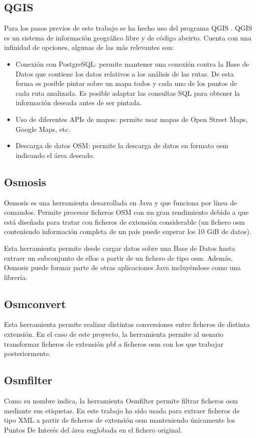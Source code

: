 \subsection{QGIS}
Para los pasos previos de este trabajo se ha hecho uso del programa QGIS \cite{qgis:info}. QGIS es un sistema de información geográfico libre y de código abeirto. Cuenta con una infinidad de opciones, algunas de las más relevantes son:

\begin{itemize}
	\item Conexión con PostgreSQL: permite mantener una conexión contra la Base de Datos que contiene los datos relativos a los análisis de las rutas. De esta forma es posible pintar sobre un mapa todos y cada uno de los puntos de cada ruta analizada. Es posible adaptar las consultas SQL para obtener la información deseada antes de ser pintada.
	\item Uso de diferentes APIs de mapas: permite usar mapas de Open Street Maps, Google Maps, etc.
	\item Descarga de datos OSM: permite la descarga de datos en formato osm indicando el área deseado.
\end{itemize}

\subsection{Osmosis}
Osmosis \cite{osmosis:info} es una herramienta desarrollada en Java y que funciona por línea de comandos. Permite procesar ficheros OSM con un gran rendimiento debido a que está diseñada para tratar con ficheros de extensión considerable (un fichero osm conteniendo información completa de un país puede superar los 10 GiB de datos).

Esta herramienta permite desde cargar datos sobre una Base de Datos hasta extraer un subconjunto de ellos a partir de un fichero de tipo osm. Además, Osmosis puede formar parte de otras aplicaciones Java incluyéndose como una librería.

\subsection{Osmconvert} \cite{osmconvert:wiki}
Esta herramienta permite realizar distintas conversiones entre ficheros de distinta extensión. En el caso de este proyecto, la herramienta permite al usuario transformar ficheros de extensión pbf a ficheros osm con los que trabajar posteriormente.

\subsection{Osmfilter} \cite{osmfilter:wiki}
Como su nombre indica, la herramienta Osmfilter permite filtrar ficheros osm mediante sus etiquetas. En este trabajo ha sido usada para extraer ficheros de tipo XML a partir de ficheros de extensión osm manteniendo únicamente los Puntos De Interés del área englobada en el fichero original.


